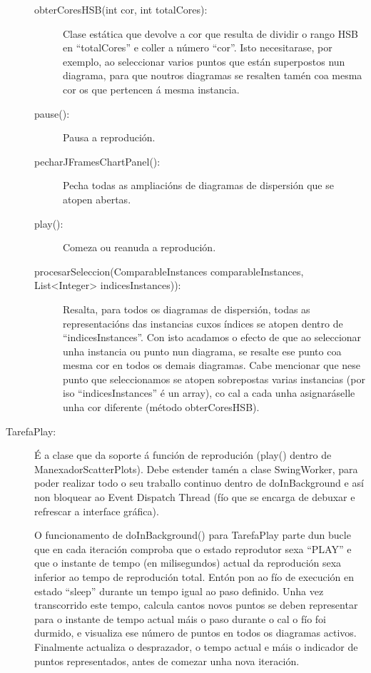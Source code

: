 \begin{description}
\begin{description}
\item[obterCoresHSB(int cor, int totalCores):] \hfill
Clase estática que devolve a cor que resulta de dividir o rango HSB en ``totalCores'' e coller a número ``cor''. Isto necesitarase, por exemplo, ao seleccionar varios puntos que están superpostos nun diagrama, para que noutros diagramas se resalten tamén coa mesma cor os que pertencen á mesma instancia.
\item[pause():] \hfill
Pausa a reprodución.
\item[pecharJFramesChartPanel():] \hfill
Pecha todas as ampliacións de diagramas de dispersión que se atopen abertas.
\item[play():] \hfill
Comeza ou reanuda a reprodución.
\item[procesarSeleccion(ComparableInstances comparableInstances, List\textless Integer\textgreater{} indicesInstances)):] \hfill
Resalta, para todos os diagramas de dispersión, todas as representacións das instancias cuxos índices se atopen dentro de ``indicesInstances''. Con isto acadamos o efecto de que ao seleccionar unha instancia ou punto nun diagrama, se resalte ese punto coa mesma cor en todos os demais diagramas. Cabe mencionar que nese punto que seleccionamos se atopen sobrepostas varias instancias (por iso ``indicesInstances'' é un array), co cal a cada unha asignaráselle unha cor diferente (método obterCoresHSB).
\end{description}

\item[TarefaPlay:] \hfill
É a clase que da soporte á función de reprodución (play() dentro de ManexadorScatterPlots). Debe estender tamén a clase SwingWorker, para poder realizar todo o seu traballo continuo dentro de doInBackground e así non bloquear ao Event Dispatch Thread (fío que se encarga de debuxar e refrescar a interface gráfica).

O funcionamento de doInBackground() para TarefaPlay parte dun bucle que en cada iteración comproba que o estado reprodutor sexa ``PLAY'' e que o instante de tempo (en milisegundos) actual da reprodución sexa inferior ao tempo de reprodución total. Entón pon ao fío de execución en estado ``sleep'' durante un tempo igual ao paso definido. Unha vez transcorrido este tempo, calcula cantos novos puntos se deben representar para o instante de tempo actual máis o paso durante o cal o fío foi durmido, e visualiza ese número de puntos en todos os diagramas activos. Finalmente actualiza o desprazador, o tempo actual e máis o indicador de puntos representados, antes de comezar unha nova iteración.


\end{description}
